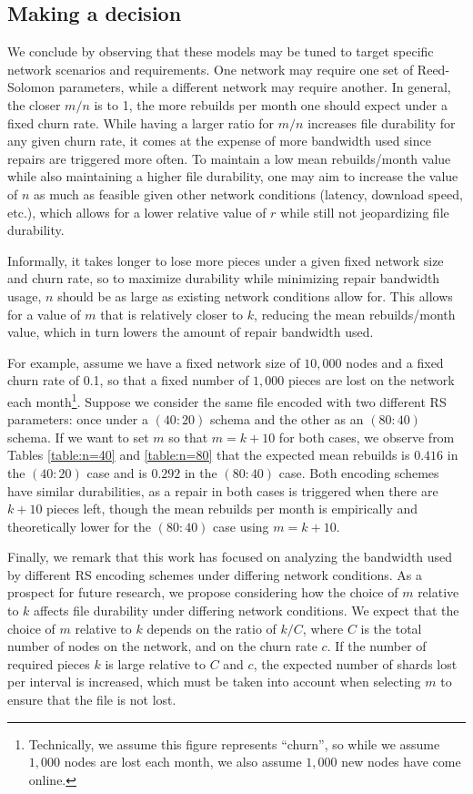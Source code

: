 \subsection{Making a decision}

We conclude by observing that these models may be tuned to target specific network scenarios and requirements. One network may require one set of Reed-Solomon parameters, while a different network may require another. In general, the closer $m/n$ is to 1, the more rebuilds per month one should expect under a fixed churn rate. While having a larger ratio for $m/n$ increases file durability for any given churn rate, it comes at the expense of more bandwidth used since repairs are triggered more often. To maintain a low mean rebuilds/month value while also maintaining a higher file durability, one may aim to increase the value of $n$ as much as feasible given other network conditions (latency, download speed, etc.), which allows for a lower relative value of $r$ while still not jeopardizing file durability. 

Informally, it takes longer to lose more pieces under a given fixed network size and churn rate, so to maximize durability while minimizing repair bandwidth usage, $n$ should be as large as existing network conditions allow for. This allows for a value of $m$ that is relatively closer to $k$, reducing the mean rebuilds/month value, which in turn lowers the amount of repair bandwidth used. 

For example, assume we have a fixed network size of $10,000$ nodes and a fixed churn rate of 0.1, so that a fixed number of $1,000$ pieces are lost on the network each month\footnote{
Technically, we assume this figure represents ``churn'', so while we assume $1,000$ nodes are lost each month, we also assume $1,000$ new nodes have come online.
}. 
Suppose we consider the same file encoded with two different RS parameters: once under a $(40:20)$ schema and the other as an $(80:40)$ schema. If we want to set $m$ so that $m=k+10$ for both cases, we observe from Tables \ref{table:n=40} and \ref{table:n=80} that the expected mean rebuilds is $0.416$ in the $(40:20)$ case and is $0.292$ in the $(80:40)$ case. Both encoding schemes have similar durabilities, as a repair in both cases is triggered when there are $k+10$ pieces left, though the mean rebuilds per month is empirically and theoretically lower for the $(80:40)$ case using $m=k+10$. 

Finally, we remark that this work has focused on analyzing the bandwidth used by different RS encoding schemes under differing network conditions. As a prospect for future research, we propose considering how the choice of $m$ relative to $k$ affects file durability under differing network conditions. We expect that the choice of $m$ relative to $k$ depends on the ratio of $k/C$, where $C$ is the total number of nodes on the network, and on the churn rate $c$. If the number of required pieces $k$ is large relative to $C$ and $c$, the expected number of shards lost per interval is increased, which must be taken into account when selecting $m$ to ensure that the file is not lost.